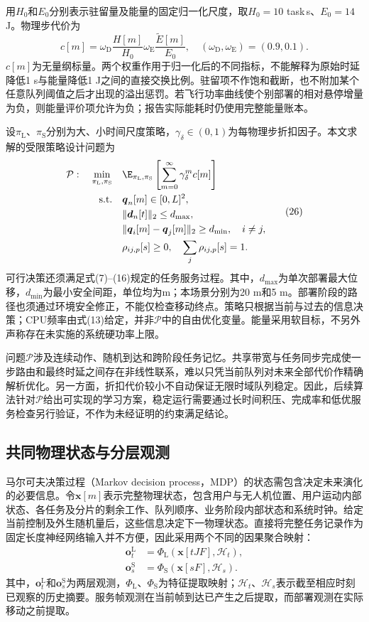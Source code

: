 用$H_0$和$E_0$分别表示驻留量及能量的固定归一化尺度，取$H_0=10$ task\,s、$E_0=14$ J。物理步代价为
\[
c[m]=\omega_{\mathrm D}\frac{H[m]}{H_0}
 \omega_{\mathrm E}\frac{\widetilde E[m]}{E_0},
 \quad(\omega_{\mathrm D},\omega_{\mathrm E})=(0.9,0.1).\tag{25}
\]
$c[m]$为无量纲标量。两个权重作用于归一化后的不同指标，不能解释为原始时延降低1 s与能量降低1 J之间的直接交换比例。驻留项不作饱和截断，也不附加某个任意队列阈值之后才出现的溢出惩罚。若飞行功率曲线使个别部署的相对悬停增量为负，则能量评价项允许为负；报告实际能耗时仍使用完整能量账本。

设$\pi_{\mathrm L}$、$\pi_{\mathrm S}$分别为大、小时间尺度策略，$\gamma_\delta\in(0,1)$为每物理步折扣因子。本文求解的受限策略设计问题为
\[
\begin{aligned}
 \mathcal P:\quad
 \min_{\pi_{\mathrm L},\pi_{\mathrm S}}\quad&
 \E_{\pi_{\mathrm L},\pi_{\mathrm S}}
 \left[\sum_{m=0}^{\infty}\gamma_\delta^m c[m]\right]\\
 \text{s.t.}\quad&
 \boldsymbol q_n[m]\in[0,L]^2,\\
 &\|\boldsymbol d_n[t]\|_2\le d_{\max},\\
 &\|\boldsymbol q_i[m]-\boldsymbol q_j[m]\|_2\ge d_{\min},\quad i\ne j,\\
 &\rho_{ij,p}[s]\ge0,\quad\sum_j\rho_{ij,p}[s]=1.
 \end{aligned}\tag{26}
\]
可行决策还须满足式(7)--(16)规定的任务服务过程。其中，$d_{\max}$为单次部署最大位移，$d_{\min}$为最小安全间距，单位均为m；本场景分别为20 m和5 m。部署阶段的路径也须通过环境安全修正，不能仅检查移动终点。策略只根据当前与过去的信息决策；CPU频率由式(13)给定，并非$\mathcal P$中的自由优化变量。能量采用软目标，不另外声称存在未实施的系统硬功率上限。

问题$\mathcal P$涉及连续动作、随机到达和跨阶段任务记忆。共享带宽与任务同步完成使一步路由和最终时延之间存在非线性联系，难以只凭当前队列对未来全部代价作精确解析优化。另一方面，折扣代价较小不自动保证无限时域队列稳定。因此，后续算法针对$\mathcal P$给出可实现的学习方案，稳定运行需要通过长时间积压、完成率和低优服务检查另行验证，不作为未经证明的约束满足结论。

\subsection{共同物理状态与分层观测}
马尔可夫决策过程（Markov decision process，MDP）的状态需包含决定未来演化的必要信息。令$\boldsymbol x[m]$表示完整物理状态，包含用户与无人机位置、用户运动内部状态、各任务及分片的剩余工作、队列顺序、业务阶段内部状态和系统时钟。给定当前控制及外生随机量后，这些信息决定下一物理状态。直接将完整任务记录作为固定长度神经网络输入并不方便，因此采用两个不同的因果聚合映射：
\[
\begin{aligned}
 \boldsymbol o_t^{\mathrm L}&=\Phi_{\mathrm L}(\boldsymbol x[tJF],\mathcal H_t),\\
 \boldsymbol o_s^{\mathrm S}&=\Phi_{\mathrm S}(\boldsymbol x[sF],\mathcal H_s).
 \end{aligned}\tag{27}
\]
其中，$\boldsymbol o_t^{\mathrm L}$和$\boldsymbol o_s^{\mathrm S}$为两层观测，$\Phi_{\mathrm L}$、$\Phi_{\mathrm S}$为特征提取映射；$\mathcal H_t$、$\mathcal H_s$表示截至相应时刻已观察的历史摘要。服务帧观测在当前帧到达已产生之后提取，而部署观测在实际移动之前提取。

